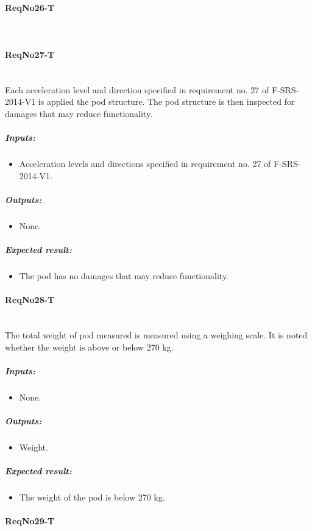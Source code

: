 \paragraph{ReqNo26-T}\mbox{}\\ %

\paragraph{ReqNo27-T}\mbox{}\\ %
 Each acceleration level and direction specified in requirement no. 27 of F-SRS-2014-V1 is applied the pod structure. The pod structure is then inspected for damages that may reduce functionality.

	\subparagraph{Inputs:}
	\begin{itemize}
	\item Acceleration levels and directions specified in requirement no. 27 of F-SRS-2014-V1.
	\end{itemize}
	\subparagraph{Outputs:}
	\begin{itemize}
	\item None.
	\end{itemize}
	\subparagraph{Expected result:}
	\begin{itemize}
	\item The pod has no damages that may reduce functionality.
	\end{itemize}


\paragraph{ReqNo28-T}\mbox{}\\ %
The total weight of pod measured is measured using a weighing scale. It is noted whether the weight is above or below 270 kg.
\\
	\subparagraph{Inputs:}
	\begin{itemize}
	\item None.
	\end{itemize}
	\subparagraph{Outputs:}
	\begin{itemize}
	\item Weight.
	\end{itemize}
	\subparagraph{Expected result:}
	\begin{itemize}
	\item The weight of the pod is below 270 kg.
	\end{itemize}

\paragraph{ReqNo29-T}\mbox{}\\ %


